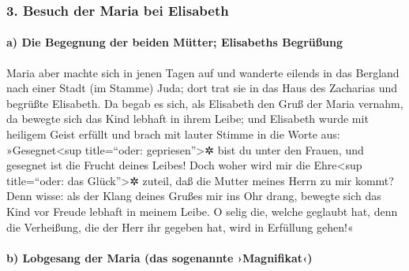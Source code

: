 \hypertarget{besuch-der-maria-bei-elisabeth}{%
\subsubsection{3. Besuch der Maria bei
Elisabeth}\label{besuch-der-maria-bei-elisabeth}}

\hypertarget{a-die-begegnung-der-beiden-muxfctter-elisabeths-begruxfcuxdfung}{%
\paragraph{a) Die Begegnung der beiden Mütter; Elisabeths
Begrüßung}\label{a-die-begegnung-der-beiden-muxfctter-elisabeths-begruxfcuxdfung}}

 Maria aber machte sich in jenen Tagen auf und wanderte
eilends in das Bergland nach einer Stadt (im Stamme) Juda;
 dort trat sie in das Haus des Zacharias und begrüßte
Elisabeth.  Da begab es sich, als Elisabeth den Gruß der
Maria vernahm, da bewegte sich das Kind lebhaft in ihrem Leibe; und
Elisabeth wurde mit heiligem Geist erfüllt  und brach mit
lauter Stimme in die Worte aus: »Gesegnet\textless sup title=``oder:
gepriesen''\textgreater✲ bist du unter den Frauen, und gesegnet ist die
Frucht deines Leibes!  Doch woher wird mir die
Ehre\textless sup title=``oder: das Glück''\textgreater✲ zuteil, daß die
Mutter meines Herrn zu mir kommt?  Denn wisse: als der
Klang deines Grußes mir ins Ohr drang, bewegte sich das Kind vor Freude
lebhaft in meinem Leibe.  O selig die, welche geglaubt
hat, denn die Verheißung, die der Herr ihr gegeben hat, wird in
Erfüllung gehen!«

\hypertarget{b-lobgesang-der-maria-das-sogenannte-magnifikat}{%
\paragraph{b) Lobgesang der Maria (das sogenannte
›Magnifikat‹)}\label{b-lobgesang-der-maria-das-sogenannte-magnifikat}}

